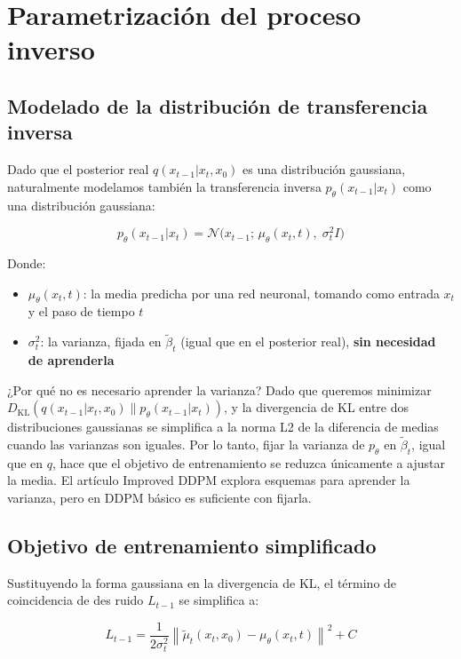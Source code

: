 \section{Parametrización del proceso inverso}

\subsection{Modelado de la distribución de transferencia inversa}

Dado que el posterior real $q(x_{t-1}|x_t, x_0)$ es una distribución gaussiana, naturalmente modelamos también la transferencia inversa $p_\theta(x_{t-1}|x_t)$ como una distribución gaussiana:

$$p_\theta(x_{t-1}|x_t) = \mathcal{N}\big(x_{t-1};\, \mu_\theta(x_t, t),\; \sigma_t^2 I\big)$$

Donde:
\begin{itemize}
    \item $\mu_\theta(x_t, t)$: la media predicha por una red neuronal, tomando como entrada $x_t$ y el paso de tiempo $t$
    \item $\sigma_t^2$: la varianza, fijada en $\tilde{\beta}_t$ (igual que en el posterior real), \textbf{sin necesidad de aprenderla}
\end{itemize}

\begin{knowledgebox}{¿Por qué no es necesario aprender la varianza?}
Dado que queremos minimizar $D_{\text{KL}}(q(x_{t-1}|x_t,x_0) \| p_\theta(x_{t-1}|x_t))$, y la divergencia de KL entre dos distribuciones gaussianas se simplifica a la norma L2 de la diferencia de medias cuando las varianzas son iguales. Por lo tanto, fijar la varianza de $p_\theta$ en $\tilde{\beta}_t$, igual que en $q$, hace que el objetivo de entrenamiento se reduzca únicamente a ajustar la media. El artículo Improved DDPM explora esquemas para aprender la varianza, pero en DDPM básico es suficiente con fijarla.
\end{knowledgebox}

\subsection{Objetivo de entrenamiento simplificado}

Sustituyendo la forma gaussiana en la divergencia de KL, el término de coincidencia de des ruido $L_{t-1}$ se simplifica a:

$$L_{t-1} = \frac{1}{2\sigma_t^2} \left\| \tilde{\mu}_t(x_t, x_0) - \mu_\theta(x_t, t) \right\|^2 + C$$

